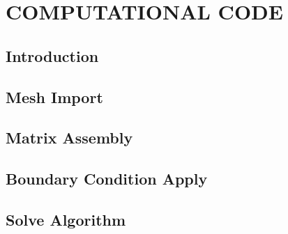 \chapter{\textbf{COMPUTATIONAL CODE}}
\label{codigo numerico}

\section{\textbf{Introduction}} 


\section{\textbf{Mesh Import}} 
\label{trimesh}



\section{\textbf{Matrix Assembly}} 
\label{trielem}



\section{\textbf{Boundary Condition Apply}} 
\label{tricond}



\section{\textbf{Solve Algorithm}} 
\label{simulador}




